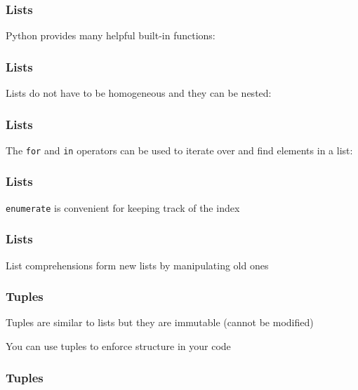 \documentclass{beamer}
\begin{document}
\begin{frame}
\frametitle{Lists}
Python provides many helpful built-in functions:


\end{frame}

\begin{frame}
\frametitle{Lists}

Lists do not have to be homogeneous and they can be nested:


\end{frame}


\begin{frame}
\frametitle{Lists}

The \texttt{for} and \texttt{in} operators can be used to iterate over and find elements in a list:


\end{frame}

\begin{frame}
\frametitle{Lists}

\texttt{enumerate} is convenient for keeping track of the index


\end{frame}


\begin{frame}
\frametitle{Lists}

List comprehensions form new lists by manipulating old ones


\end{frame}


\begin{frame}
\frametitle{Tuples}

Tuples are similar to lists but they are immutable (cannot be modified)

\vspace{0.1in}

You can use tuples to enforce structure in your code
\end{frame}

\begin{frame}
\frametitle{Tuples}


\end{frame}
\end{document}
